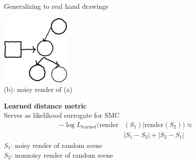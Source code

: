 \documentclass[final]{beamer}
\newlength{\onecolwid}
\newlength{\twocolwid}
\begin{document}
\begin{frame}[t]
\begin{columns}[t]
\begin{column}{\twocolwid}
\begin{columns}[t,totalwidth=\twocolwid]
\begin{column}{\onecolwid}
\begin{block}{Generalizing to real hand drawings}
\begin{minipage}[t]{\noisySize}
    \centering\includegraphics[width = \textwidth]{figures/60-1-reduced.png}\\
{\small     (b): noisy render of (a)}
  \end{minipage}\hfill%
  \begin{minipage}[t]{0.5\textwidth}\vspace{-9cm}
    \textbf{Learned distance metric}\\
    Serves as likelihood surrogate for SMC
      \begin{align*}
    -\log L_{\text{learned}}(\text{render}&(S_1)|\text{render}(S_2))\approx\\& |S_1 - S_2| + |S_2 - S_1|\label{symmetricDistance}
      \end{align*}
      $S_1$: noisy render of random scene\\
      $S_2$: nonnoisy render of random scene
  \end{minipage}%

  \vspace{3cm}


\end{block}
\end{column}
\end{columns}
\end{column}
\end{columns}
\end{frame}
\end{document}

